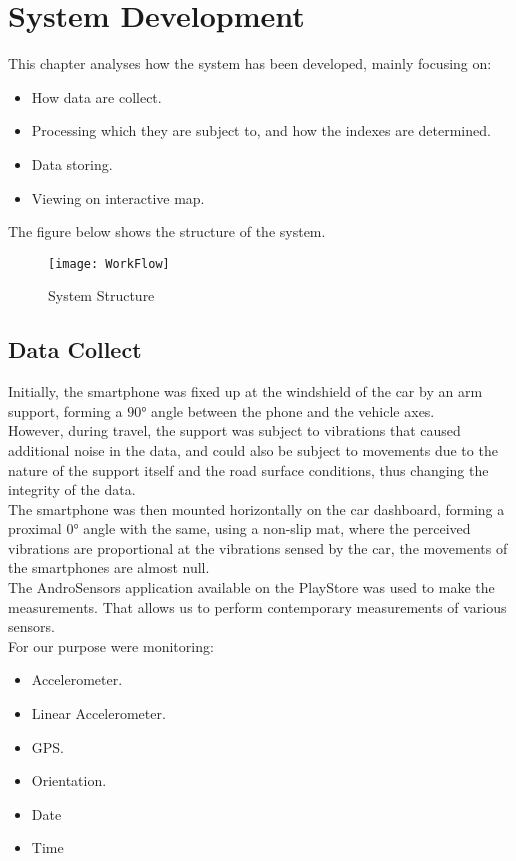 \documentclass[tesi]{subfiles}
\begin{document}
\chapter{System Development}
\label{ch:System Development}
This chapter analyses how the system has been developed, mainly focusing on:

\begin{itemize}
\item How data are collect.
\item Processing which they are subject to, and how the indexes are determined.
\item Data storing.
\item Viewing on interactive map.
\end{itemize}


\clearpage
\noindent The figure below shows the structure of the system.
\begin{figure}[H]
\centering
\texttt{[image: WorkFlow]}
\caption{System Structure}

\end{figure}\label{fig:System Structure}

\section{Data Collect}\label{sc:Data Collect}
Initially, the smartphone was fixed up at the windshield of the car by an arm support, forming a $90°$ angle between the phone and the vehicle axes.\\
However, during travel, the support was subject to vibrations that caused additional noise in the data, and could also be subject to movements due to the nature of the support itself and the road surface conditions, thus changing the integrity of the data.\\
The smartphone was then mounted horizontally on the car dashboard, forming a proximal $0°$ angle with the same, using a non-slip mat, where the perceived vibrations are proportional at the vibrations sensed by the car, the movements of the smartphones are almost null.\\
The AndroSensors application available on the PlayStore was used to make the measurements. That allows us to perform contemporary measurements of various sensors.\\
For our purpose were monitoring:

\begin{itemize}
\item Accelerometer.
\item Linear Accelerometer.
\item GPS.
\item Orientation.
\item Date
\item Time
\end{itemize}
\end{document}
